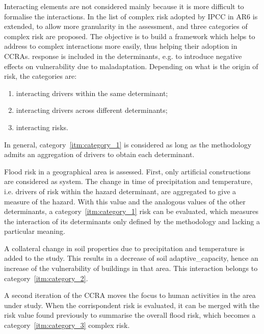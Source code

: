 Interacting elements are not considered mainly because it is more difficult to formalise the interactions. In \cite{2021SimpsonAFramework} the list of complex \gls{risk} adopted by \gls{IPCC} in \gls{AR6} is extended, to allow more granularity in the assessment, and three categories of complex \gls{risk} are proposed. The objective is to build a framework which helps to address to complex interactions more easily, thus helping their adoption in \glspl{CCRA}. \Gls{response} is included in the \glspl{determinant}, e.g. to introduce negative effects on \gls{vulnerability} due to maladaptation.
Depending on what is the origin of \gls{risk}, the categories are:\cite[493]{2021SimpsonAFramework}
\begin{enumerate}
  \item \label{itm:category_1} interacting \glspl{driver} within the same \gls{determinant};
  \item \label{itm:category_2} interacting \glspl{driver} across different \glspl{determinant};
  \item \label{itm:category_3} interacting \glspl{risk}.
\end{enumerate}
In general, category~\ref{itm:category_1} is considered as long as the methodology admits an aggregation of \glspl{driver} to obtain each \gls{determinant}.
\begin{example}
  Flood \gls{risk} in a geographical area is assessed. First, only artificial constructions are considered as system.
  The change in time of precipitation and temperature, i.e. \glspl{driver} of \gls{risk} within the \gls{hazard} \gls{determinant}, are aggregated to give a measure of the \gls{hazard}. With this value and the analogous values of the other \glspl{determinant}, a category~\ref{itm:category_1} \gls{risk} can be evaluated, which measures the interaction of its \glspl{determinant} only defined by the methodology and lacking a particular meaning.
  
  A collateral change in soil properties due to precipitation and temperature is added to the study. This results in a decrease of soil \gls{adaptive_capacity}, hence an increase of the \gls{vulnerability} of buildings in that area. This interaction belongs to category~\ref{itm:category_2}.
  
  A second iteration of the \gls{CCRA} moves the focus to human activities in the area under study. When the corrispondent \gls{risk} is evaluated, it can be merged with the \gls{risk} value found previously to summarise the overall flood \gls{risk}, which becomes a category~\ref{itm:category_3} complex \gls{risk}.
\end{example}

